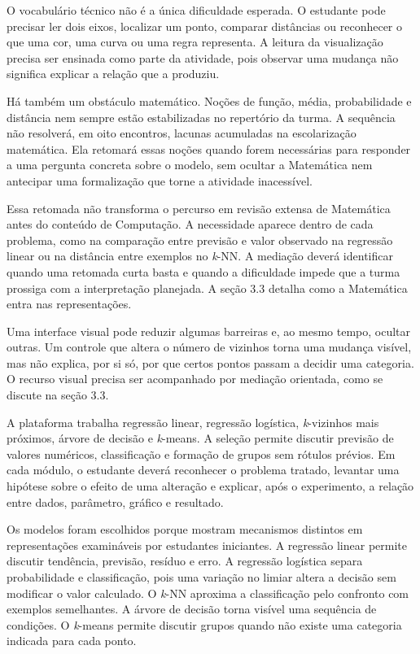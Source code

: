 O vocabulário técnico não é a única dificuldade esperada. O estudante pode precisar ler dois eixos, localizar um ponto, comparar distâncias ou reconhecer o que uma cor, uma curva ou uma regra representa. A leitura da visualização precisa ser ensinada como parte da atividade, pois observar uma mudança não significa explicar a relação que a produziu.

Há também um obstáculo matemático. Noções de função, média, probabilidade e distância nem sempre estão estabilizadas no repertório da turma. A sequência não resolverá, em oito encontros, lacunas acumuladas na escolarização matemática. Ela retomará essas noções quando forem necessárias para responder a uma pergunta concreta sobre o modelo, sem ocultar a Matemática nem antecipar uma formalização que torne a atividade inacessível.

Essa retomada não transforma o percurso em revisão extensa de Matemática antes do conteúdo de Computação. A necessidade aparece dentro de cada problema, como na comparação entre previsão e valor observado na regressão linear ou na distância entre exemplos no \textit{k}-NN. A mediação deverá identificar quando uma retomada curta basta e quando a dificuldade impede que a turma prossiga com a interpretação planejada. A seção 3.3 detalha como a Matemática entra nas representações.

Uma interface visual pode reduzir algumas barreiras e, ao mesmo tempo, ocultar outras. Um controle que altera o número de vizinhos torna uma mudança visível, mas não explica, por si só, por que certos pontos passam a decidir uma categoria. O recurso visual precisa ser acompanhado por mediação orientada, como se discute na seção 3.3.

A plataforma trabalha regressão linear, regressão logística, \textit{k}-vizinhos mais próximos, árvore de decisão e \textit{k}-means. A seleção permite discutir previsão de valores numéricos, classificação e formação de grupos sem rótulos prévios. Em cada módulo, o estudante deverá reconhecer o problema tratado, levantar uma hipótese sobre o efeito de uma alteração e explicar, após o experimento, a relação entre dados, parâmetro, gráfico e resultado.

Os modelos foram escolhidos porque mostram mecanismos distintos em representações examináveis por estudantes iniciantes. A regressão linear permite discutir tendência, previsão, resíduo e erro. A regressão logística separa probabilidade e classificação, pois uma variação no limiar altera a decisão sem modificar o valor calculado. O \textit{k}-NN aproxima a classificação pelo confronto com exemplos semelhantes. A árvore de decisão torna visível uma sequência de condições. O \textit{k}-means permite discutir grupos quando não existe uma categoria indicada para cada ponto.


